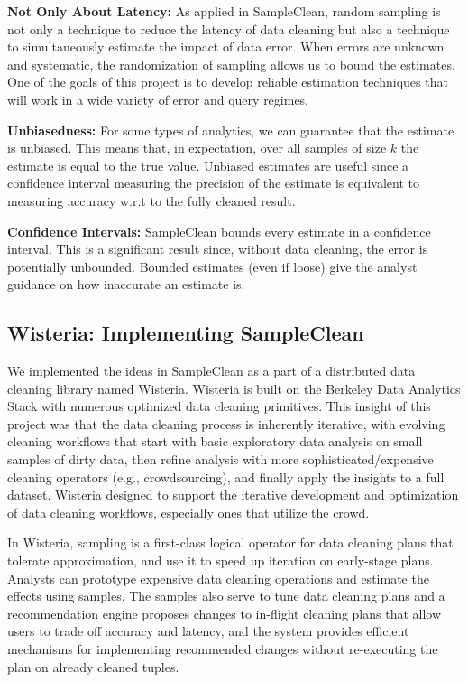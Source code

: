 \vspace{0.5em}
\noindent\textbf{Not Only About Latency: } As applied in SampleClean, random sampling is not only a technique to reduce the latency of data cleaning but also a technique to simultaneously estimate the impact of data error.
When errors are unknown and systematic, the randomization of sampling allows us to bound the estimates.
One of the goals of this project is to develop reliable estimation techniques that will work in a wide variety of error and query regimes.

\vspace{0.5em}
\noindent\textbf{Unbiasedness: } For some types of analytics, we can guarantee that the estimate is unbiased. This means that, in expectation, over all samples of size $k$ the estimate is equal to the true value. Unbiased estimates are useful since a confidence interval measuring the precision of the estimate is equivalent to measuring accuracy w.r.t to the fully cleaned result.

\vspace{0.5em}
\noindent\textbf{Confidence Intervals: } SampleClean bounds every estimate in a confidence interval. This is a significant result since, without data cleaning, the error is potentially unbounded. Bounded estimates (even if loose) give the analyst guidance on how inaccurate an estimate is.

\subsection{Wisteria: Implementing SampleClean \cite{haas2015wisteria}}
We implemented the ideas in SampleClean as a part of a distributed data cleaning library named Wisteria.
Wisteria is built on the Berkeley Data Analytics Stack with numerous optimized data cleaning primitives.
This insight of this project was that the data cleaning process is inherently iterative, with evolving cleaning workflows that 
start with basic exploratory data analysis on small samples of dirty data, then refine analysis with 
more sophisticated/expensive cleaning operators (e.g., crowdsourcing), and finally apply the insights to a full dataset.
Wisteria designed to support the iterative development and optimization of data cleaning workflows, especially ones that utilize the crowd.

In Wisteria, sampling is a first-class logical operator for data cleaning plans that tolerate approximation, and use it to speed up iteration on early-stage plans.
Analysts can prototype expensive data cleaning operations and estimate the effects using samples.
The samples also serve to tune data cleaning plans and a recommendation engine proposes changes to in-flight cleaning plans that allow users to trade off accuracy and latency, and the system provides efficient mechanisms for implementing recommended changes without re-executing the plan on already cleaned tuples.

